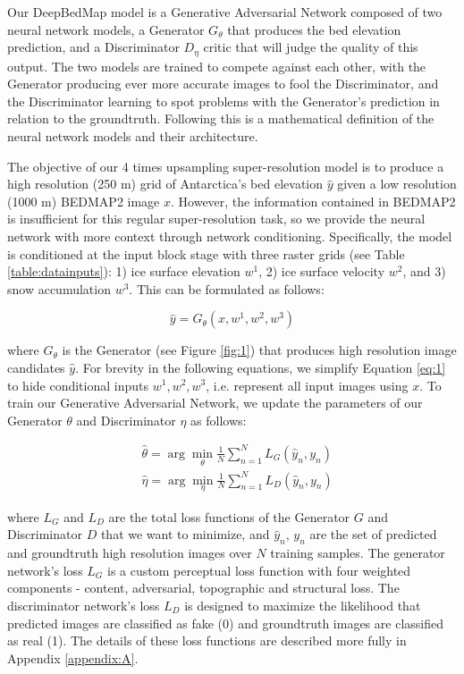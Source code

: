 \documentclass[tc, manuscript]{copernicus}
\begin{document}
Our DeepBedMap model is a Generative Adversarial Network \citep{GoodfellowGenerativeAdversarialNetworks2014} composed of two neural network models, a Generator $G_\theta$ that produces the bed elevation prediction, and a Discriminator $D_\eta$ critic that will judge the quality of this output.
The two models are trained to compete against each other, with the Generator producing ever more accurate images to fool the Discriminator, and the Discriminator learning to spot problems with the Generator's prediction in relation to the groundtruth.
Following this is a mathematical definition of the neural network models and their architecture.

The objective of our 4 times upsampling super-resolution model is to produce a high resolution (250 m) grid of Antarctica's bed elevation $\hat{y}$ given a low resolution (1000 m) BEDMAP2 \citep{FretwellBedmap2improvedice2013} image $x$.
However, the information contained in BEDMAP2 is insufficient for this regular super-resolution task, so we provide the neural network with more context through network conditioning.
Specifically, the model is conditioned at the input block stage with three raster grids (see Table \ref{table:datainputs}): 1) ice surface elevation $w^1$, 2) ice surface velocity $w^2$, and 3) snow accumulation $w^3$.
This can be formulated as follows:

\begin{equation}\label{eq:1}
  \hat{y} = G_\theta(x, w^1, w^2, w^3)
\end{equation}

where $G_\theta$ is the Generator (see Figure \ref{fig:1}) that produces high resolution image candidates $\hat{y}$.
For brevity in the following equations, we simplify Equation \eqref{eq:1} to hide conditional inputs $w^1, w^2, w^3$, i.e. represent all input images using $x$.
To train our Generative Adversarial Network, we update the parameters of our Generator $\theta$ and Discriminator $\eta$ as follows:

\begin{align}
  & \hat{\theta} = \arg\min_{\theta} \frac{1}{N}\sum_{n=1}^{N}L_G(\hat{y}_n, y_n) \label{eq:2}\\
  & \hat{\eta} = \arg\min_{\eta} \frac{1}{N}\sum_{n=1}^{N}L_D(\hat{y}_n, y_n) \label{eq:3}
\end{align}

where $L_G$ and $L_D$ are the total loss functions of the Generator $G$ and Discriminator $D$ that we want to minimize, and $\hat{y}_n$, $y_n$ are the set of predicted and groundtruth high resolution images over $N$ training samples.
The generator network's loss $L_G$ is a custom perceptual loss function with four weighted components - content, adversarial, topographic and structural loss.
The discriminator network's loss $L_D$ is designed to maximize the likelihood that predicted images are classified as fake (0) and groundtruth images are classified as real (1).
The details of these loss functions are described more fully in Appendix \ref{appendix:A}.
\end{document}
